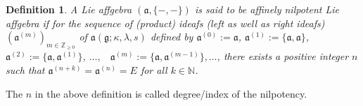 \documentclass{article}
\newtheorem{definition}{Definition}[section]
\theoremstyle{definition}
\theoremstyle{remark}
\theoremstyle{plain}
\begin{document}
\begin{definition}
    A Lie affgebra $(\mathfrak{a},\{-,-\})$ is said to be affinely nilpotent Lie affgebra if for the sequence of (product) ideafs (left as well as right ideafs) $(\mathfrak{a}^{(m)})_{m \in \mathbb{Z}_{\geq 0}}$ of $\mathfrak{a}(\mathfrak{g}; \kappa, \lambda, s)$  defined by $\mathfrak{a}^{(0)}:=\mathfrak{a}$, $\mathfrak{a}^{(1)}:=\{\mathfrak{a}, \mathfrak{a}\}$, $\mathfrak{a}^{(2)}:=\{\mathfrak{a}, \mathfrak{a}^{(1)}\}$, $\ldots,$~ $ \mathfrak{a}^{(m)}:=\{\mathfrak{a}, \mathfrak{a}^{(m-1)}\}, \ldots $, there exists a positive integer $n$ such that $\mathfrak{a}^{(n+k)}=\mathfrak{a}^{(n)}=E$ for all $k\in \mathbb{N}$.
\end{definition}
The $n$ in the above definition is called degree/index of the nilpotency.
\end{document}

